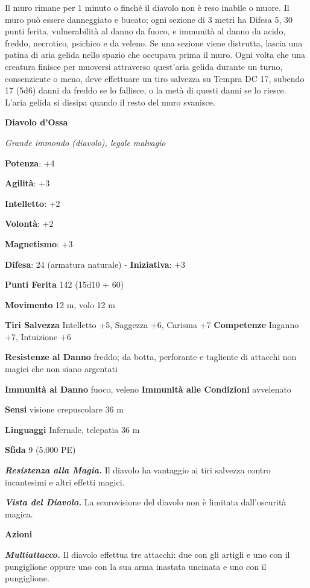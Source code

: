 \begin{multicols}{2}
Il muro rimane per 1 minuto o finché il diavolo non è reso inabile o
muore. Il muro può essere danneggiato e bucato; ogni sezione di 3 metri
ha Difesa 5, 30 punti ferita, vulnerabilità al danno da fuoco, e immunità al
danno da acido, freddo, necrotico, psichico e da veleno. Se una sezione
viene distrutta, lascia una patina di aria gelida nello spazio che
occupava prima il muro. Ogni volta che una creatura finisce per muoversi
attraverso quest'aria gelida durante un turno, consenziente o meno, deve
effettuare un tiro salvezza su Tempra DC 17, subendo 17 (5d6)
danni da freddo se lo fallisce, o la metà di questi danni se lo riesce.
L'aria gelida si dissipa quando il resto del muro svanisce.


\textbf{Diavolo d'Ossa}

\emph{Grande immondo (diavolo), legale malvagio}

\textbf{Potenza}: +4

\textbf{Agilità}: +3

\textbf{Intelletto}: +2

\textbf{Volontà}: +2

\textbf{Magnetismo}: +3

\textbf{Difesa}: 24 (armatura naturale) - \textbf{Iniziativa}: +3

\textbf{Punti Ferita} 142 (15d10 + 60)

\textbf{Movimento} 12 m, volo 12 m

\textbf{Tiri Salvezza} Intelletto +5, Saggezza +6, Carisma +7
\textbf{Competenze} Inganno +7, Intuizione +6

\textbf{Resistenze al Danno} freddo; da botta, perforante e tagliente
di attacchi non magici che non siano argentati

\textbf{Immunità al Danno} fuoco, veleno \textbf{Immunità alle
Condizioni} avvelenato

\textbf{Sensi} visione crepuscolare 36 m

\textbf{Linguaggi} Infernale, telepatia 36 m 

\textbf{Sfida} 9 (5.000 PE)\smallskip

\emph{\textbf{Resistenza alla Magia.}} Il diavolo ha vantaggio ai tiri
salvezza contro incantesimi e altri effetti magici.

\emph{\textbf{Vista del Diavolo.}} La scurovisione del diavolo non è
limitata dall'oscurità magica.

\smallskip\textbf{Azioni}

\emph{\textbf{Multiattacco.}} Il diavolo effettua tre attacchi: due con
gli artigli e uno con il pungiglione oppure uno con la sua arma inastata
uncinata e uno con il pungiglione.


\end{multicols}
